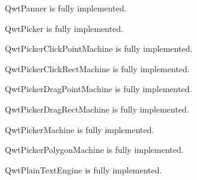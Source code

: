 \documentclass[a4paper,10pt,english]{manual}
\begin{document}
\hypertarget{PyQt4.Qwt5.QwtPanner}{}\begin{classdesc}{QwtPanner}{}
is fully implemented.
\end{classdesc}

\hypertarget{PyQt4.Qwt5.QwtPicker}{}\begin{classdesc}{QwtPicker}{}
is fully implemented.
\end{classdesc}

\hypertarget{PyQt4.Qwt5.QwtPickerClickPointMachine}{}\begin{classdesc}{QwtPickerClickPointMachine}{}
is fully implemented.
\end{classdesc}

\hypertarget{PyQt4.Qwt5.QwtPickerClickRectMachine}{}\begin{classdesc}{QwtPickerClickRectMachine}{}
is fully implemented.
\end{classdesc}

\hypertarget{PyQt4.Qwt5.QwtPickerDragPointMachine}{}\begin{classdesc}{QwtPickerDragPointMachine}{}
is fully implemented.
\end{classdesc}

\hypertarget{PyQt4.Qwt5.QwtPickerDragRectMachine}{}\begin{classdesc}{QwtPickerDragRectMachine}{}
is fully implemented.
\end{classdesc}

\hypertarget{PyQt4.Qwt5.QwtPickerMachine}{}\begin{classdesc}{QwtPickerMachine}{}
is fully implemented.
\end{classdesc}

\hypertarget{PyQt4.Qwt5.QwtPickerPolygonMachine}{}\begin{classdesc}{QwtPickerPolygonMachine}{}
is fully implemented.
\end{classdesc}

\hypertarget{PyQt4.Qwt5.QwtPlainTextEngine}{}\begin{classdesc}{QwtPlainTextEngine}{}
is fully implemented.
\end{classdesc}
\end{document}
